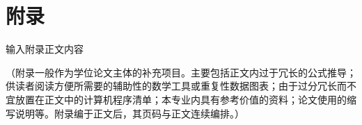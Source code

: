 \newpage






\section*{\hei{}附\quad 录}

    \song{}
    输入附录正文内容
    
    （附录一般作为学位论文主体的补充项目。主要包括正文内过于冗长的公式推导；供读者阅读方便所需要的辅助性的数学工具或重复性数据图表；由于过分冗长而不宜放置在正文中的计算机程序清单；本专业内具有参考价值的资料；论文使用的缩写说明等。附录编于正文后，其页码与正文连续编排。）




\setcounter{secnumdepth}{4}

